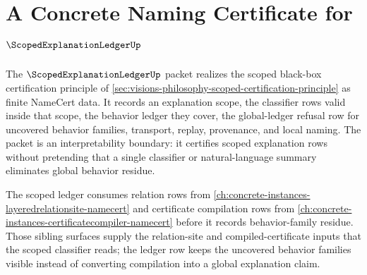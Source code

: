 \chapter{A Concrete Naming Certificate for $\ScopedExplanationLedgerUp$}
\label{ch:concrete-instances-scoped-explanation-ledger-namecert}

The $\ScopedExplanationLedgerUp$ packet realizes the scoped black-box certification principle of \autoref{sec:visions-philosophy-scoped-certification-principle} as finite NameCert data. It records an explanation scope, the classifier rows valid inside that scope, the behavior ledger they cover, the global-ledger refusal row for uncovered behavior families, transport, replay, provenance, and local naming. The packet is an interpretability boundary: it certifies scoped explanation rows without pretending that a single classifier or natural-language summary eliminates global behavior residue.

The scoped ledger consumes relation rows from \autoref{ch:concrete-instances-layeredrelationsite-namecert} and certificate compilation rows from \autoref{ch:concrete-instances-certificatecompiler-namecert} before it records behavior-family residue. Those sibling surfaces supply the relation-site and compiled-certificate inputs that the scoped classifier reads; the ledger row keeps the uncovered behavior families visible instead of converting compilation into a global explanation claim.

